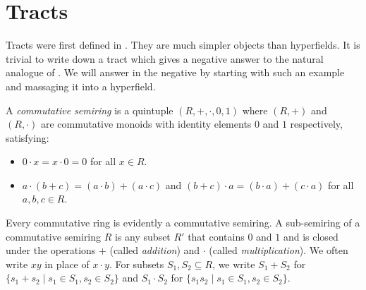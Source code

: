 \documentclass[reqno]{amsart}
\theoremstyle{definition}
\theoremstyle{remark}
\begin{document}
    \section{Tracts}\label{sec:tracts}
    Tracts were first defined in \cite{bb19}. They are much simpler objects than hyperfields. It is trivial to write down a tract which gives a negative answer to the natural analogue of . 
    We will answer  in the negative by starting with such an example and massaging it into a hyperfield.

    A \emph{commutative semiring} is a quintuple $(R, +, \cdot, 0, 1)$ where $(R, +)$ and $(R, \cdot)$ are commutative monoids with identity elements $0$ and $1$ respectively, satisfying:
    \begin{itemize}
        \item $0 \cdot x = x \cdot 0 = 0$ for all $x \in R$.
        \item $a \cdot (b + c) = (a \cdot b) + (a \cdot c)$ and 
        $(b + c) \cdot a = (b \cdot a) + (c \cdot a)$ for all $a,b,c \in R$.
    \end{itemize}
    Every commutative ring is evidently a commutative semiring.
    A sub-semiring of a commutative semiring $R$ is any subset $R'$ that contains $0$ and $1$ and is closed under the operations $+$ (called \emph{addition}) and $\cdot$ (called \emph{multiplication}).
    We often write $xy$ in place of $x \cdot y$.
    For subsets $S_1, S_2 \subseteq R$, we write 
    $S_1 + S_2$ for $\{s_1 + s_2 \mid s_1 \in S_1, s_2 \in S_2\}$ and $S_1 \cdot S_2$ for $\{s_1 s_2 \mid s_1 \in S_1, s_2 \in S_2\}$.
\end{document}
